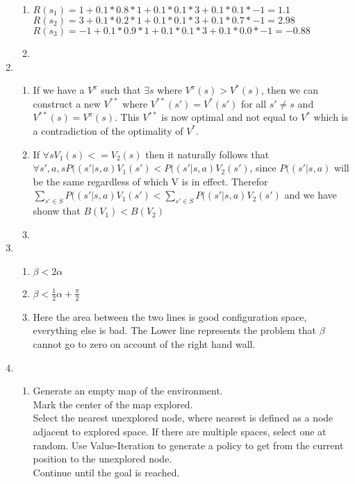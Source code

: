 \documentclass[11pt,fleqn]{article}
\begin{document}
\begin{enumerate}
\begin{enumerate}
\item 
$R(s_{1})=1 +0.1*0.8*1 + 0.1*0.1*3+ 0.1*0.1*-1 = 1.1$\\
$R(s_{2})=3 +0.1*0.2*1 + 0.1*0.1*3+ 0.1*0.7*-1 = 2.98$\\
$R(s_{3})=-1 +0.1*0.9*1 + 0.1*0.1*3+ 0.1*0.0*-1 = -0.88$\\
\item 

\end{enumerate}

\item %
\begin{enumerate}
\item If we have a $V^{\pi}$ such that $\exists s$ where $V^{\pi}(s)>V^{*}(s)$, then we can construct a new $V^{**}$ where $V^{**}(s')=V^{*}(s')$ for all $s'\ne s$ and $V^{**}(s)=V^{\pi}(s)$. This $V^{**}$ is now optimal and not equal to $V^{*}$ which is a contradiction of the optimality of $V^{*}$.
\item 
If $\forall s V_{1}(s)<=V_{2}(s)$ then it naturally follows that $\forall s',a, s P((s'|s,a)V_{1}(s') < P((s'|s,a)V_{2}(s')$, since $P((s'|s,a) $ will be the same regardless of which V is in effect. Therefor
 $\sum_{s'\in S}  P((s'|s,a)V_{1}(s') < \sum_{s'\in S} P((s'|s,a)V_{2}(s')$ and we have shonw that $B(V_{1})<B(V_{2})$ 
\item 

\end{enumerate}
\item %
\begin{enumerate}
\item $\beta < 2\alpha$
\item $\beta<\frac{1}{2} \alpha +\frac{\pi}{2}$

\item 

Here the area between the two lines is good configuration space, everything else is bad. The Lower line represents the problem that $\beta$ cannot go to zero on account of the right hand wall. 
\end{enumerate}
\item %
\begin{enumerate}
\item
Generate an empty map of the environment.  \\ 
Mark the center of the map explored. \\
Select the nearest unexplored node, where nearest is defined as a node adjacent to explored space. If there are multiple spaces, select one at random. Use Value-Iteration to generate a policy to  get from the current position to the unexplored node. \\
Continue until the goal is reached.\\


\end{enumerate}
\end{enumerate}
\end{document}
